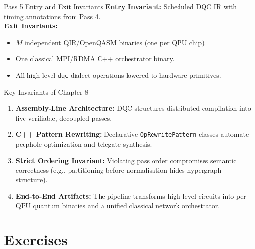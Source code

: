 \begin{passbox}{Pass 5 Entry and Exit Invariants}
\textbf{Entry Invariant:} Scheduled DQC IR with timing annotations from Pass 4.\\
\textbf{Exit Invariants:}
\begin{itemize}
    \item $M$ independent QIR/OpenQASM binaries (one per QPU chip).
    \item One classical MPI/RDMA C++ orchestrator binary.
    \item All high-level \texttt{dqc} dialect operations lowered to hardware primitives.
\end{itemize}
\end{passbox}


\begin{summarybox}{Key Invariants of Chapter 8}
\begin{enumerate}
    \item \textbf{Assembly-Line Architecture:} DQC structures distributed compilation into five verifiable, decoupled passes.
    \item \textbf{C++ Pattern Rewriting:} Declarative \texttt{OpRewritePattern} classes automate peephole optimization and telegate synthesis.
    \item \textbf{Strict Ordering Invariant:} Violating pass order compromises semantic correctness (e.g., partitioning before normalisation hides hypergraph structure).
    \item \textbf{End-to-End Artifacts:} The pipeline transforms high-level circuits into per-QPU quantum binaries and a unified classical network orchestrator.
\end{enumerate}
\end{summarybox}


\section*{Exercises}

